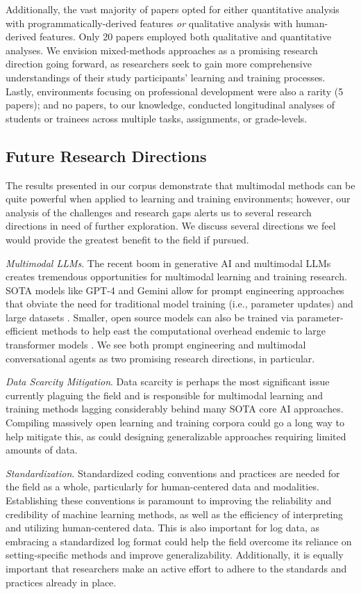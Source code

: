 \documentclass[manuscript,screen,review]{acmart}
\begin{document}
Additionally, the vast majority of papers opted for either quantitative analysis with programmatically-derived features \textit{or} qualitative analysis with human-derived features. Only 20 papers employed both qualitative and quantitative analyses. We envision mixed-methods approaches as a promising research direction going forward, as researchers seek to gain more comprehensive understandings of their study participants' learning and training processes. Lastly, environments focusing on professional development were also a rarity (5 papers); and no papers, to our knowledge, conducted longitudinal analyses of students or trainees across multiple tasks, assignments, or grade-levels. 

\subsection{Future Research Directions} 

The results presented in our corpus demonstrate that multimodal methods can be quite powerful when applied to learning and training environments; however, our analysis of the challenges and research gaps alerts us to several research directions in need of further exploration. We discuss several directions we feel would provide the greatest benefit to the field if pursued. 

\textit{Multimodal LLMs}. The recent boom in generative AI and multimodal LLMs creates tremendous opportunities for multimodal learning and training research. SOTA models like GPT-4 \cite{openai2023gpt4} and Gemini \cite{team2023gemini} allow for prompt engineering approaches that obviate the need for traditional model training (i.e., parameter updates) and large datasets \cite{cohn2023chain}. Smaller, open source models can also be trained via parameter-efficient methods to help east the computational overhead endemic to large transformer models \cite{dettmers2023qlora}. We see both prompt engineering and multimodal conversational agents as two promising research directions, in particular.

\textit{Data Scarcity Mitigation}. Data scarcity is perhaps the most significant issue currently plaguing the field and is responsible for multimodal learning and training methods lagging considerably behind many SOTA core AI approaches. Compiling massively open learning and training corpora could go a long way to help mitigate this, as could designing generalizable approaches requiring limited amounts of data.

\textit{Standardization}. Standardized coding conventions and practices are needed for the field as a whole, particularly for human-centered data and modalities. Establishing these conventions is paramount to improving the reliability and credibility of machine learning methods, as well as the efficiency of interpreting and utilizing human-centered data. This is also important for log data, as embracing a standardized log format could help the field overcome its reliance on setting-specific methods and improve generalizability. Additionally, it is equally important that researchers make an active effort to adhere to the standards and practices already in place. 
\end{document}
